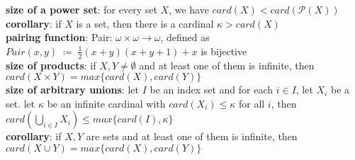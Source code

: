 \documentclass[a4paper]{article}
\begin{document}
\begin{framed}
	\noindent
	\textbf{size of a power set}: for every set $X$, we have $card(X) < card(\mathcal{P}(X))$\\
	\textbf{corollary}: if $X$ is a set, then there is a cardinal $\kappa > card(X)$\\
	\textbf{pairing function}: Pair: $\omega \times \omega \rightarrow \omega$, defined as $Pair(x, y) \; \coloneqq \; \frac{1}{2}(x + y)(x + y + 1) + x$ is bijective\\
	\textbf{size of products}: if $X, Y \neq \emptyset$ and at least one of them is infinite, then $card(X \times Y) = max\{card(X), card(Y)\}$\\
	\textbf{size of arbitrary unions}: let $I$ be an index set and for each $i \in I$, let $X_i$ be a set. let $\kappa$ be an infinite cardinal with $card(X_i) \leq \kappa$ for all $i$, then $card(\bigcup_{i \in I} X_i) \leq max\{ card(I), \kappa \}$\\
	\textbf{corollary}: if $X, Y$ are sets and at least one of them is infinite, then $card(X \cup Y) = max\{card(X), card(Y)\}$
\end{framed}
\end{document}
